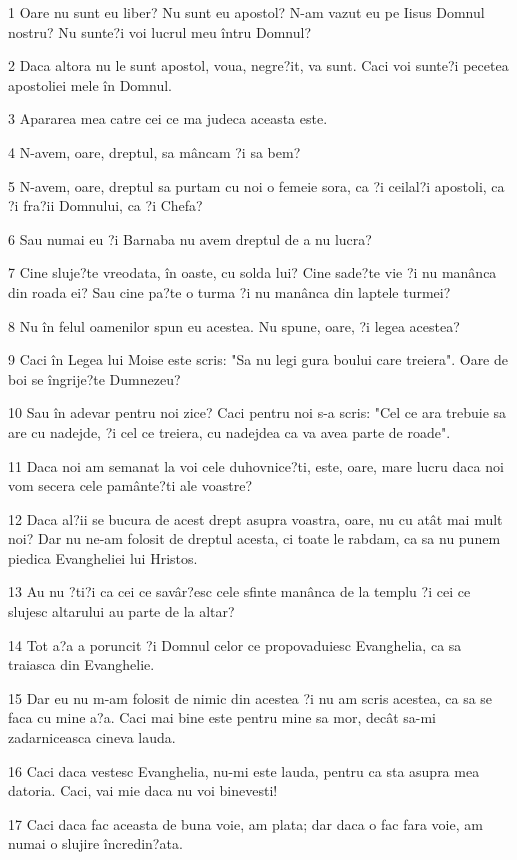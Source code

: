 \par 1 Oare nu sunt eu liber? Nu sunt eu apostol? N-am vazut eu pe Iisus Domnul nostru? Nu sunte?i voi lucrul meu întru Domnul?
\par 2 Daca altora nu le sunt apostol, voua, negre?it, va sunt. Caci voi sunte?i pecetea apostoliei mele în Domnul.
\par 3 Apararea mea catre cei ce ma judeca aceasta este.
\par 4 N-avem, oare, dreptul, sa mâncam ?i sa bem?
\par 5 N-avem, oare, dreptul sa purtam cu noi o femeie sora, ca ?i ceilal?i apostoli, ca ?i fra?ii Domnului, ca ?i Chefa?
\par 6 Sau numai eu ?i Barnaba nu avem dreptul de a nu lucra?
\par 7 Cine sluje?te vreodata, în oaste, cu solda lui? Cine sade?te vie ?i nu manânca din roada ei? Sau cine pa?te o turma ?i nu manânca din laptele turmei?
\par 8 Nu în felul oamenilor spun eu acestea. Nu spune, oare, ?i legea acestea?
\par 9 Caci în Legea lui Moise este scris: "Sa nu legi gura boului care treiera". Oare de boi se îngrije?te Dumnezeu?
\par 10 Sau în adevar pentru noi zice? Caci pentru noi s-a scris: "Cel ce ara trebuie sa are cu nadejde, ?i cel ce treiera, cu nadejdea ca va avea parte de roade".
\par 11 Daca noi am semanat la voi cele duhovnice?ti, este, oare, mare lucru daca noi vom secera cele pamânte?ti ale voastre?
\par 12 Daca al?ii se bucura de acest drept asupra voastra, oare, nu cu atât mai mult noi? Dar nu ne-am folosit de dreptul acesta, ci toate le rabdam, ca sa nu punem piedica Evangheliei lui Hristos.
\par 13 Au nu ?ti?i ca cei ce savâr?esc cele sfinte manânca de la templu ?i cei ce slujesc altarului au parte de la altar?
\par 14 Tot a?a a poruncit ?i Domnul celor ce propovaduiesc Evanghelia, ca sa traiasca din Evanghelie.
\par 15 Dar eu nu m-am folosit de nimic din acestea ?i nu am scris acestea, ca sa se faca cu mine a?a. Caci mai bine este pentru mine sa mor, decât sa-mi zadarniceasca cineva lauda.
\par 16 Caci daca vestesc Evanghelia, nu-mi este lauda, pentru ca sta asupra mea datoria. Caci, vai mie daca nu voi binevesti!
\par 17 Caci daca fac aceasta de buna voie, am plata; dar daca o fac fara voie, am numai o slujire încredin?ata.
